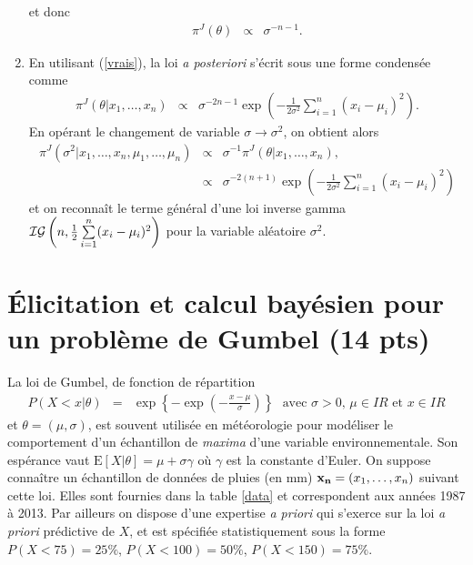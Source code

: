 \documentclass[10pt]{article}
\newcommand{\R}{I\!\!R}
\newcommand{\E}{\mbox{E}}
\newcommand{\1}{\mathbbm{1}}
\begin{document}
\begin{enumerate}
$$$$
et donc
\begin{eqnarray*}
\pi^J(\theta) & \propto & \sigma^{-n-1}.
\end{eqnarray*}
\item En utilisant (\ref{vrais}), la loi {\it a posteriori} s'écrit sous une forme condensée comme 
\begin{eqnarray*}
\pi^J(\theta|x_1,\ldots,x_n) & \propto & \sigma^{-2n-1} \exp\left(-\frac{1}{2\sigma^2}\sum\limits_{i=1}^n (x_i-\mu_i)^2\right).
\end{eqnarray*}
En opérant le changement de variable $\sigma \to \sigma^2$, on obtient alors
\begin{eqnarray*}
\pi^J(\sigma^2|x_1,\ldots,x_n,\mu_1,\ldots,\mu_n) & \propto & \sigma^{-1} \pi^J(\theta|x_1,\ldots,x_n), \\
& \propto &  \sigma^{-2(n+1)} \exp\left(-\frac{1}{2\sigma^2}\sum\limits_{i=1}^n (x_i-\mu_i)^2\right)
\end{eqnarray*}
et on reconnaît le terme général  d'une loi inverse gamma ${\cal{IG}}\left(n,\frac{1}{2}\sum\limits_{i=1}^n (x_i-\mu_i)^2\right)$ pour la variable aléatoire $\sigma^2$. 


\end{enumerate}

\section{\'Elicitation et calcul bayésien pour un problème de Gumbel (14 pts)}

La loi de Gumbel, de fonction de r\'epartition
\begin{eqnarray*}
P(X<x|\theta) & = & \exp\left\{-\exp\left(-\frac{x-\mu}{\sigma}\right)\right\} \ \ \ \text{avec $\sigma>0$, $\mu\in\R$ et $x\in\R$}
\end{eqnarray*}
et $\theta=(\mu,\sigma)$,  est souvent utilis\'ee en météorologie  pour modéliser le comportement d'un échantillon de {\it maxima} d'une variable environnementale. Son espérance vaut $\E[X|\theta]=\mu + \sigma \gamma$ où $\gamma$ est la constante d'Euler. On suppose connaître un échantillon de données de pluies (en mm) ${\bf x_n}=(x_1,\ldots,x_n)$ suivant cette loi. Elles sont fournies dans la table \ref{data} et correspondent aux années 1987 à 2013. Par ailleurs on dispose d'une expertise {\it a priori} qui s'exerce sur la loi {\it a priori} prédictive de $X$, et est spécifiée statistiquement sous la forme
$P(X<75)=25\%$, $P(X<100)=50\%$, $P(X<150)=75\%$. \\
\end{document}
